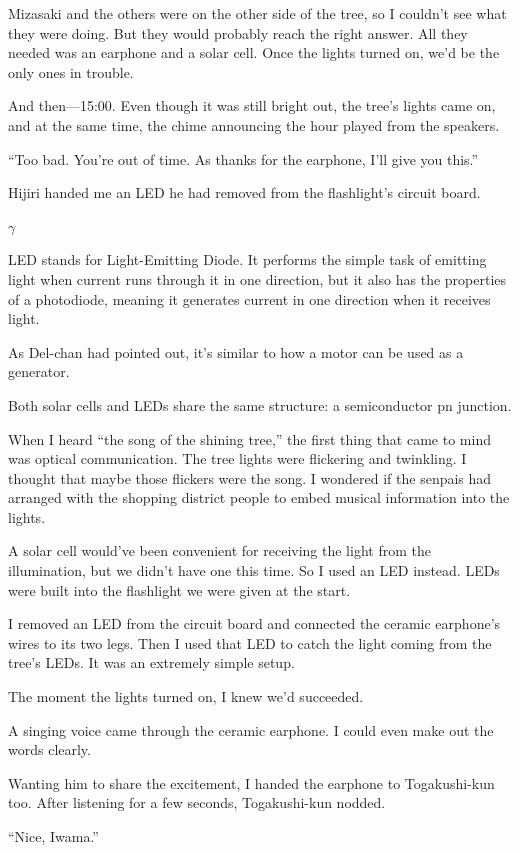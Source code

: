 \documentclass[
    a4paper,
    12pt,
    twoside,
    openany,
    UTF8,
    fontset=windows
]{ctexbook}
\begin{document}
Mizasaki and the others were on the other side of the tree, so I couldn't see what they were doing. But they would probably reach the right answer. All they needed was an earphone and a solar cell. Once the lights turned on, we'd be the only ones in trouble.

And then---15:00. Even though it was still bright out, the tree's lights came on, and at the same time, the chime announcing the hour played from the speakers.

``Too bad. You're out of time. As thanks for the earphone, I'll give you this.''

Hijiri handed me an LED he had removed from the flashlight's circuit board.

$\gamma$

LED stands for Light-Emitting Diode. It performs the simple task of emitting light when current runs through it in one direction, but it also has the properties of a photodiode, meaning it generates current in one direction when it receives light.

As Del-chan had pointed out, it's similar to how a motor can be used as a generator.

Both solar cells and LEDs share the same structure: a semiconductor pn junction.

When I heard ``the song of the shining tree,'' the first thing that came to mind was optical communication. The tree lights were flickering and twinkling. I thought that maybe those flickers were the song. I wondered if the senpais had arranged with the shopping district people to embed musical information into the lights.

A solar cell would've been convenient for receiving the light from the illumination, but we didn't have one this time. So I used an LED instead. LEDs were built into the flashlight we were given at the start.

I removed an LED from the circuit board and connected the ceramic earphone's wires to its two legs. Then I used that LED to catch the light coming from the tree's LEDs. It was an extremely simple setup.

The moment the lights turned on, I knew we'd succeeded.

A singing voice came through the ceramic earphone. I could even make out the words clearly.

Wanting him to share the excitement, I handed the earphone to Togakushi-kun too. After listening for a few seconds, Togakushi-kun nodded.

``Nice, Iwama.''
\end{document}
